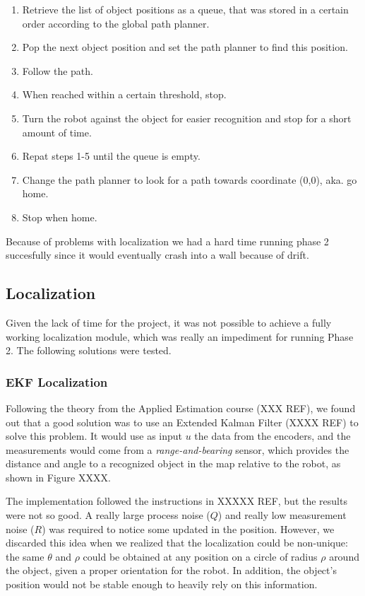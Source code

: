 \begin{enumerate}
\item Retrieve the list of object positions as a queue, that was stored in a certain order according to the global path planner.
\item Pop the next object position and set the path planner to find this position.
\item Follow the path.
\item When reached within a certain threshold, stop.
\item Turn the robot against the object for easier recognition and stop for a short amount of time.
\item Repat steps 1-5 until the queue is empty.
\item Change the path planner to look for a path towards coordinate (0,0), aka. go home.
\item Stop when home.
\end{enumerate}

Because of problems with localization we had a hard time running phase 2 succesfully since it would eventually crash into a wall because of drift.

\subsection{Localization}
Given the lack of time for the project, it was not possible to achieve a fully working localization module, which was really an impediment for running Phase 2. The following solutions were tested.

\subsubsection{EKF Localization}
Following the theory from the Applied Estimation course (XXX REF), we found out that a good solution was to use an Extended Kalman Filter (XXXX REF) to solve this problem. It would use as input $u$ the data from the encoders, and the measurements would come from a \emph{range-and-bearing} sensor, which provides the distance and angle to a recognized object in the map relative to the robot, as shown in Figure XXXX.

The implementation followed the instructions in XXXXX REF, but the results were not so good. A really large process noise ($Q$) and really low measurement noise ($R$) was required to notice some updated in the position. However, we discarded this idea when we realized that the localization could be non-unique: the same $\theta$ and $\rho$ could be obtained at any position on a circle of radius $\rho$ around the object, given a proper orientation for the robot. In addition, the object's position would not be stable enough to heavily rely on this information. 

